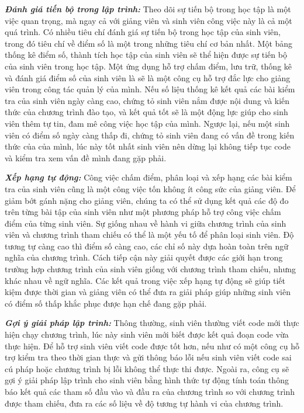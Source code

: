\textbf{\textit{Đánh giá tiến bộ trong lập trình:}} Theo dõi sự tiến bộ trong học tập là một việc quan trọng, mà ngay cả với giảng viên và sinh viên công việc này là cả một quá trình. Có nhiều tiêu chí đánh giá sự tiến bộ trong học tập của sinh viên, trong đó tiêu chí về điểm số là một trong những tiêu chí cơ bản nhất. Một bảng thống kê điểm số, thành tích học tập của sinh viên sẽ thể hiện được sự tiến bộ của sinh viên trong học tập. Một ứng dụng hỗ trợ chấm điểm, lưu trữ, thống kê và đánh giá điểm số của sinh viên là sẽ là một công cụ hỗ trợ đắc lực cho giảng viên trong công tác quản lý của mình. Nếu số liệu thống kê kết quả các bài kiểm tra của sinh viên ngày càng cao, chứng tỏ sinh viên nắm được nội dung và kiến thức của chương trình đào tạo, và kết quả tốt sẽ là một động lực giúp cho sinh viên thêm tự tin, đam mê công việc học tập của mình. Ngược lại, nếu một sinh viên có điểm số ngày càng thấp đi, chứng tỏ sinh viên đang có vấn đề trong kiến thức của của mình, lúc này tốt nhất sinh viên nên dừng lại không tiếp tục code và kiểm tra xem vấn đề mình đang gặp phải. 

\textit{\textbf{Xếp hạng tự động:}} Công việc chấm điểm, phân loại và xếp hạng các bài kiểm tra của sinh viên cũng là một công việc tốn không ít công sức của giảng viên. Để giảm bớt gánh nặng cho giảng viên, chúng ta có thể sử dụng kết quả các độ đo trên từng bài tập của sinh viên như một phương pháp hỗ trợ công việc chấm điểm của từng sinh viên. Sự giống nhau về hành vi giữa chương trình của sinh viên và chương trình tham chiếu có thể là một yếu tố để phân loại sinh viên. Độ tương tự càng cao thì điểm số càng cao, các chỉ số này dựa hoàn toàn trên ngữ nghĩa của chương trình. Cách tiếp cận này giải quyết được các giới hạn trong trường hợp chương trình của sinh viên giống với chương trình tham chiếu, nhưng khác nhau về ngữ nghĩa. Các kết quả trong việc xếp hạng tự động sẽ giúp tiết kiệm được thời gian và giảng viên có thể đưa ra giải pháp giúp những sinh viên có điểm số thấp khắc phục được hạn chế đang gặp phải.

\textit{\textbf{Gợi ý giải pháp lập trình:}} Thông thường, sinh viên thường viết code mới thực hiện chạy chương trình, lúc này sinh viên mới biết được kết quả đoạn code vừa thực hiện. Để hỗ trợ sinh viên viết code được tốt hơn, nếu như có một công cụ hỗ trợ kiểm tra theo thời gian thực và gửi thông báo lỗi nếu sinh viên viết code sai cú pháp hoặc chương trình bị lỗi không thể thực thi được. Ngoài ra, công cụ sẽ gợi ý giải pháp lập trình cho sinh viên bằng hình thức tự động tính toán thông báo kết quả các tham số đầu vào và đầu ra của chương trình so với chương trình được tham chiếu, đưa ra các số liệu về độ tương tự hành vi của chương trình.	

